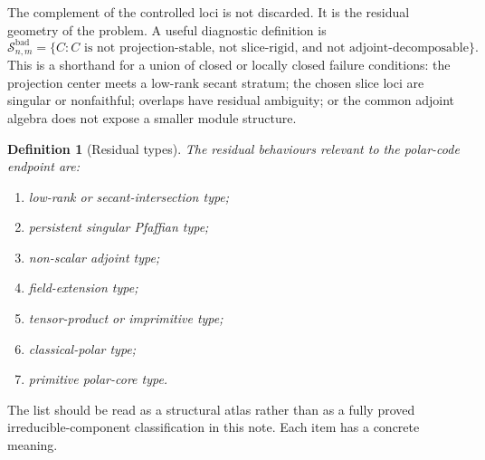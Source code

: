 \documentclass[11pt]{article}
\newtheorem{definition}[theorem]{Definition}
\begin{document}
The complement of the controlled loci is not discarded. It is the residual geometry of the problem. A useful diagnostic definition is
\[
\mathcal S_{n,m}^{\mathrm{bad}}
=
\{C:
C\text{ is not projection-stable, not slice-rigid, and not adjoint-decomposable}\}.
\]
This is a shorthand for a union of closed or locally closed failure conditions: the projection center meets a low-rank secant stratum; the chosen slice loci are singular or nonfaithful; overlaps have residual ambiguity; or the common adjoint algebra does not expose a smaller module structure.

\begin{definition}[Residual types]
The residual behaviours relevant to the polar-code endpoint are:
\begin{enumerate}[label=\arabic*.]
\item low-rank or secant-intersection type;
\item persistent singular Pfaffian type;
\item non-scalar adjoint type;
\item field-extension type;
\item tensor-product or imprimitive type;
\item classical-polar type;
\item primitive polar-core type.
\end{enumerate}
\end{definition}

The list should be read as a structural atlas rather than as a fully proved irreducible-component classification in this note. Each item has a concrete meaning.
\end{document}
